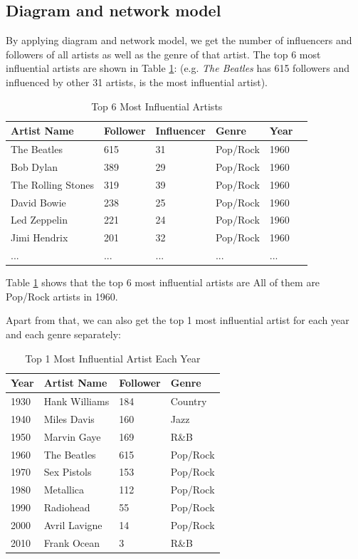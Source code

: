 \documentclass[12pt]{article}
\begin{document}
\subsection{Diagram and network model}
\label{Diagram and network model}
By applying diagram and network model, we get the number of influencers and followers of all artists as well as the genre of that artist. The top 6 most influential artists are shown in Table \ref{Top 6 Most Influential Artists}: (e.g. \emph{The Beatles} has 615 followers and influenced by other 31 artists, is the most influential artist).
\begin{table} [H] 
\begin{center}
\begin{tabular}{p{80pt}p{120pt}p{60pt}p{60pt}p{80pt}p{80pt}}
\toprule
Artist Name  & Follower & Influencer & Genre & Year\\
\midrule
The Beatles & 615 & 31 & Pop/Rock & 1960\\
Bob Dylan	& 389	& 29 & Pop/Rock& 1960\\
The Rolling Stones & 319 & 39 & Pop/Rock& 1960\\
David Bowie	& 238 &	25 & Pop/Rock& 1960\\
Led Zeppelin &	221 &	24 & Pop/Rock& 1960\\
Jimi Hendrix &	201 & 32 & Pop/Rock& 1960\\
... & ... & ... & ...& ...\\
\bottomrule
\end{tabular}
\end{center}
\caption{Top 6 Most Influential Artists}
\label{Top 6 Most Influential Artists}
\end{table}

Table \ref{Top 6 Most Influential Artists} shows that the top 6 most influential artists are All of them are Pop/Rock artists in 1960.

Apart from that, we can also get the top 1 most influential artist for each year and each genre separately:
\begin{table} [H] 
\begin{center}
\begin{tabular}{p{80pt}p{80pt}p{80pt}p{80pt}}
\toprule
Year & Artist Name & Follower & Genre\\
\midrule
1930 & Hank Williams & 184 & Country\\
1940 & Miles Davis & 160 & Jazz\\
1950 & Marvin Gaye & 169 & R\&B\\
1960 & The Beatles & 615 & Pop/Rock\\
1970 & Sex Pistols & 153 & Pop/Rock\\
1980 & Metallica &	112 & Pop/Rock\\
1990 & Radiohead &	55 & Pop/Rock\\
2000 & Avril Lavigne &	14 & Pop/Rock\\
2010 & Frank Ocean &	3 & R\&B\\
\bottomrule
\end{tabular}
\end{center}
\caption{Top 1 Most Influential Artist Each Year}
\label{Top 1 Most Influential Artist Each Year}
\end{table}
\end{document}
